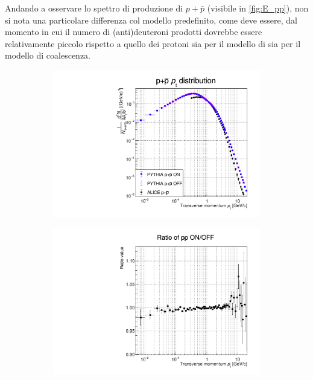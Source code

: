 Andando a osservare lo spettro di produzione di $p+\bar p$ (visibile in \autoref{fig:E_pp}), non si nota una particolare differenza col modello predefinito, come deve essere, dal momento in cui il numero di (anti)deuteroni prodotti dovrebbe essere relativamente piccolo rispetto a quello dei protoni sia per il modello di \pythiaa{} sia per il modello di coalescenza.
\begin{figure}[htb]
    \centering
    \begin{subfigure}{.49\textwidth}
    \centering
        \includegraphics[width=\textwidth]{image/3-risultati/analyse/E/pp.pdf}
        \caption{}
        \label{fig:E_pp}
    \end{subfigure}
    \begin{subfigure}{.49\textwidth}
        \centering
        \includegraphics[width=\textwidth]{image/3-risultati/analyse/E/ratio_pp_ON_OFF.pdf}
        \caption{}
        \label{fig:E_ratio_pp_ON_OFF}
    \end{subfigure}
    \label{fig:E_pp_prod}
\end{figure}
